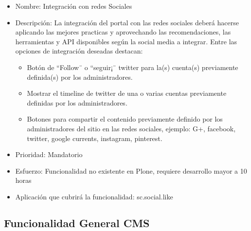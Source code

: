 \documentclass[11pt, letterpaper, oneside, spanish]{scrbook}
\begin{document}
\begin{itemize}
\item Nombre: Integración con redes Sociales
\item Descripción: La integración del portal con las redes sociales deberá hacerse
  aplicando las mejores practicas y aprovechando las recomendaciones, las
  herramientas y API disponibles según la social media a integrar. Entre las
  opciones de integración deseadas destacan:
\begin{itemize}
\item Botón de ``Follow¨ o ``seguir¡¨ twitter para la(s) cuenta(s) previamente
    definida(s) por los administradores.
\item Mostrar el timeline de twitter de una o varias cuentas previamente
    definidas por los administradores.
\item Botones para compartir el contenido previamente definido por los
    administradores del sitio en las redes sociales, ejemplo: G+, facebook,
    twitter, google currents, instagram, pinterest.
\end{itemize}
\item Prioridad: Mandatorio
\item Esfuerzo: Funcionalidad no existente en Plone, requiere desarrollo mayor a
  10 horas
\item Aplicación que cubrirá la funcionalidad: sc.social.like
\end{itemize}
\subsection{Funcionalidad General CMS}
\label{sec-2-1-21}
\end{document}
